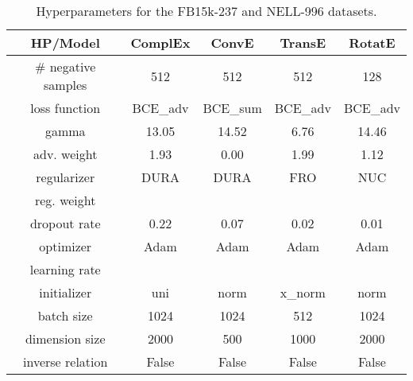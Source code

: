 \documentclass[11pt,a4paper]{article}
\begin{document}
  
  
  \begin{table*}[ht]
    \centering
    \caption{Hyperparameters for the FB15k-237  and NELL-996 datasets.}
    \label{tab:hp_fb15k237}
    \small
\begin{tabular}{c|c|c|c|c}
      \toprule
      HP/Model            & ComplEx               & ConvE                 & TransE                & RotatE                \\ \midrule
      \# negative samples & 512                   & 512                   & 512                   & 128                   \\    \midrule
      loss function       & BCE\_adv              & BCE\_sum              & BCE\_adv              & BCE\_adv              \\
      gamma               & 13.05                 & 14.52                 & 6.76                  & 14.46                 \\
      adv. weight         & 1.93                  & 0.00                  & 1.99                  & 1.12                  \\
      \midrule
      regularizer         & DURA                  & DURA                  & FRO                   & NUC                   \\
      reg. weight         &  &  &  &  \\
      dropout rate        & 0.22                  & 0.07                  & 0.02                  & 0.01                  \\
      \midrule
      optimizer           & Adam                  & Adam                  & Adam                  & Adam                  \\
      learning rate       &  &   &  &   \\
      initializer         & uni                   & norm                  & x\_norm               & norm                  \\
      \midrule
      batch size          & 1024                  & 1024                  & 512                   & 1024                  \\
      dimension size      & 2000                  & 500                   & 1000                  & 2000                  \\
      inverse relation    & False                 & False                 & False                 & False                 \\
      \bottomrule
    \end{tabular}
\end{table*}
\end{document}
